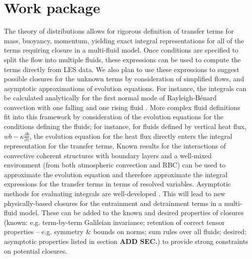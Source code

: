\documentclass[12pt]{article}
\begin{document}
\section{Work package}
The theory of distributions allows for rigorous definition of transfer terms for mass, buoyancy, momentum, yielding exact integral representations for all of the terms requiring closure in a multi-fluid model. Once conditions are specified to split the flow into multiple fluids, these expressions can be used to compute the terms directly from LES data. We also plan to use these expressions to suggest possible closures for the unknown terms by consideration of simplified flows, and asymptotic approximations of evolution equations. For instance, the integrals can be calculated analytically for the first normal mode of Rayleigh-B\'{e}nard convection with one falling and one rising fluid \parencite{ar:ShipleyEtAl2021_inPrep}. More complex fluid definitions fit into this framework by consideration of the evolution equations for the conditions defining the fluids; for instance, for fluids defined by vertical heat flux, $wb - \kappa \frac{\partial b}{\partial z}$, the evolution equation for the heat flux directly enters the integral representation for the transfer terms. Known results for the interactions of convective coherent structures with boundary layers and a well-mixed environment (from both atmospheric convection and RBC) can be used to approximate the evolution equation and therefore approximate the integral expressions for the transfer terms in terms of resolved variables. Asymptotic methods for evaluating integrals are well-developed \parencite{bk:BenderOrszag}. This will lead to new physically-based closures for the entrainment and detrainment terms in a multi-fluid model. These can be added to the known and desired properties of closures (known: e.g. term-by-term Galileian invariance; retention of correct tensor properties -- e.g. symmetry \& bounds on norms; sum rules over all fluids; desired: asymptotic properties listed in section \textbf{ADD SEC.}) to provide strong constraints on potential closures.

\printbibliography
\end{document}
